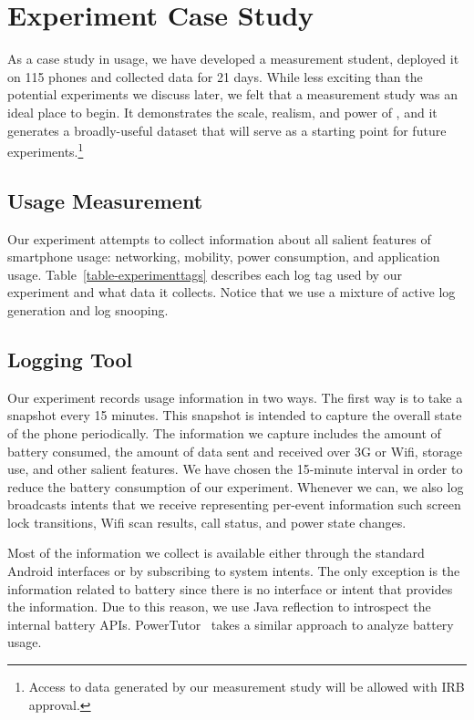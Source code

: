 \section{Experiment Case Study}
\label{sec-experiment}

As a case study in \PhoneLab{} usage, we have developed a measurement
student, deployed it on 115 phones and collected data for 21 days. While less
exciting than the potential experiments we discuss later, we felt that a
measurement study was an ideal place to begin. It demonstrates the scale,
realism, and power of \PhoneLab{}, and it generates a broadly-useful dataset
that will serve as a starting point for future experiments.\footnote{Access
to data generated by our measurement study will be allowed with IRB
approval.}

\subsection{Usage Measurement}

Our experiment attempts to collect information about all salient features of
smartphone usage: networking, mobility, power consumption, and application
usage. Table~\ref{table-experimenttags} describes each log tag used by our
experiment and what data it collects. Notice that we use a mixture of active
log generation and log snooping.

\subsection{Logging Tool}

Our experiment records usage information in two ways. The first way is to
take a snapshot every 15 minutes. This snapshot is intended to capture the
overall state of the phone periodically. The information we capture includes
the amount of battery consumed, the amount of data sent and received over 3G
or Wifi, storage use, and other salient features. We have chosen the
15-minute interval in order to reduce the battery consumption of our
experiment. Whenever we can, we also log broadcasts intents that we receive
representing per-event information such screen lock transitions, Wifi scan
results, call status, and power state changes.

Most of the information we collect is available either through the standard
Android interfaces or by subscribing to system intents. The only exception is the
information related to battery since there is no interface or intent that provides
the information. Due to this reason, we use Java reflection to introspect the
internal battery APIs. PowerTutor~\cite{zhang:codes:2010} takes a similar
approach to analyze battery usage.

